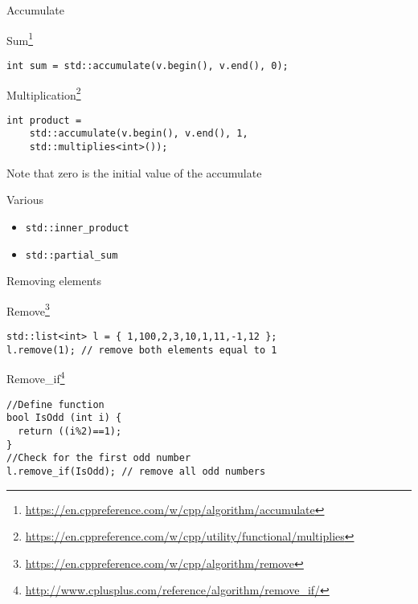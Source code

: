 \documentclass[\classoption]{beamer}
\begin{document}
\begin{frame}[fragile]{Accumulate}

\begin{block}{Sum\footnote{\tiny\url{https://en.cppreference.com/w/cpp/algorithm/accumulate}}}
\vspace{-0.25cm}
\begin{lstlisting}
int sum = std::accumulate(v.begin(), v.end(), 0);
\end{lstlisting}
\end{block}
\vspace{-0.25cm}
\begin{block}{Multiplication\footnote{\tiny\url{https://en.cppreference.com/w/cpp/utility/functional/multiplies}}}
\begin{lstlisting}
int product = 
	std::accumulate(v.begin(), v.end(), 1, 
	std::multiplies<int>());
\end{lstlisting}
\end{block}
Note that zero is the initial value of the accumulate

\begin{block}{Various}
\begin{itemize}
\item \lstinline|std::inner_product| 
\item \lstinline|std::partial_sum|
\end{itemize}
\end{block}

\end{frame}

\begin{frame}[fragile]{Removing elements}

\begin{block}{Remove\footnote{\tiny\url{https://en.cppreference.com/w/cpp/algorithm/remove}}}
\begin{lstlisting}
std::list<int> l = { 1,100,2,3,10,1,11,-1,12 };
l.remove(1); // remove both elements equal to 1
\end{lstlisting}
\end{block}
\vspace{-0.25cm}
\begin{block}{Remove\_if\footnote{\tiny\url{http://www.cplusplus.com/reference/algorithm/remove_if/}}}
\begin{lstlisting}
//Define function
bool IsOdd (int i) {
  return ((i%2)==1);
}
//Check for the first odd number
l.remove_if(IsOdd); // remove all odd numbers
\end{lstlisting}
\end{block}


\end{frame}
\end{document}
